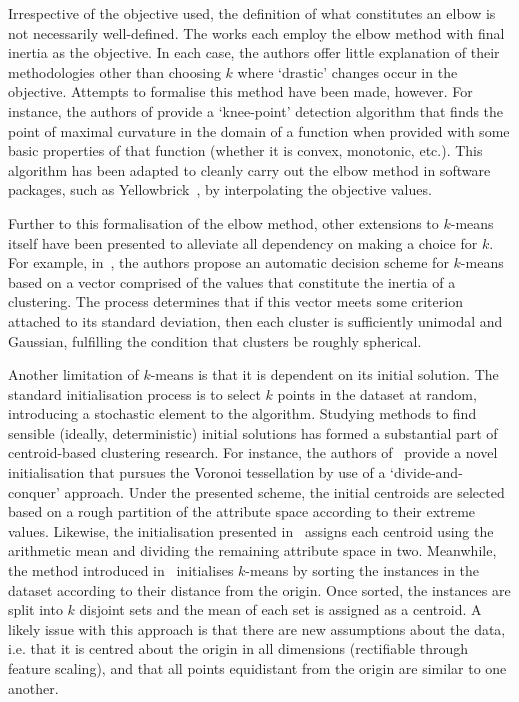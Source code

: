 Irrespective of the objective used, the definition of what constitutes an elbow
is not necessarily well-defined. The works \cite{Sujatha2013,Syakur2018} each
employ the elbow method with final inertia as the objective. In each case, the
authors offer little explanation of their methodologies other than choosing
\(k\) where `drastic' changes occur in the objective. Attempts to formalise this
method have been made, however. For instance, the authors of \cite{Satopaa2011}
provide a `knee-point' detection algorithm that finds the point of maximal
curvature in the domain of a function when provided with some basic properties
of that function (whether it is convex, monotonic, etc.). This algorithm has
been adapted to cleanly carry out the elbow method in software packages, such as
Yellowbrick~\cite{Bengfort2019}, by interpolating the objective values.

Further to this formalisation of the elbow method, other extensions to
\(k\)-means itself have been presented to alleviate all dependency on making a
choice for \(k\). For example, in~\cite{Olukanmi2019}, the authors propose an
automatic decision scheme for \(k\)-means based on a vector comprised of the
values that constitute the inertia of a clustering. The process determines that
if this vector meets some criterion attached to its standard deviation, then
each cluster is sufficiently unimodal and Gaussian, fulfilling the condition
that clusters be roughly spherical.

Another limitation of \(k\)-means is that it is dependent on its initial
solution. The standard initialisation process is to select \(k\) points in the
dataset at random, introducing a stochastic element to the algorithm. Studying
methods to find sensible (ideally, deterministic) initial solutions has formed a
substantial part of centroid-based clustering research. For instance, the
authors of~\cite{Manoharan2016} provide a novel initialisation that pursues the
Voronoi tessellation by use of a `divide-and-conquer' approach. Under the
presented scheme, the initial centroids are selected based on a rough partition
of the attribute space according to their extreme values. Likewise, the
initialisation presented in~\cite{Singh2013} assigns each centroid using the
arithmetic mean and dividing the remaining attribute space in two. Meanwhile,
the method introduced in~\cite{Katara2015} initialises \(k\)-means by sorting
the instances in the dataset according to their distance from the origin. Once
sorted, the instances are split into \(k\) disjoint sets and the mean of each
set is assigned as a centroid. A likely issue with this approach is that there
are new assumptions about the data, i.e. that it is centred about the origin in
all dimensions (rectifiable through feature scaling), and that all points
equidistant from the origin are similar to one another.

